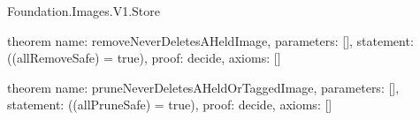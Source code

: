 \begin{lexlean}{Foundation.Images.V1.Store}
\begin{semanticmodule}
theorem{
  name: removeNeverDeletesAHeldImage,
  parameters: [],
  statement: ((allRemoveSafe) = true),
  proof: decide{},
  axioms: []
}

theorem{
  name: pruneNeverDeletesAHeldOrTaggedImage,
  parameters: [],
  statement: ((allPruneSafe) = true),
  proof: decide{},
  axioms: []
}
\end{semanticmodule}
\end{lexlean}
